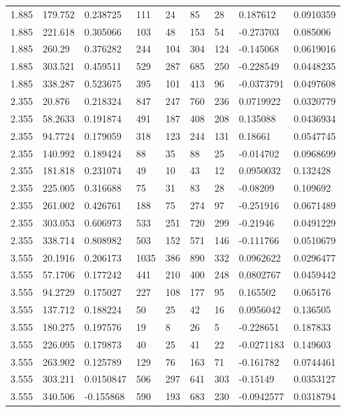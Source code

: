 \documentclass[12pt]{article}
\begin{document}
\begin{table}[!h]
\begin{center}
\begin{tabular}{||l|l|l|l|l|l|l|l|l||}
1.885    &179.752    &0.238725    &111    &24   &85   &28    &0.187612    &0.0910359\\
1.885    &221.618    &0.305066    &103    &48   &153   &54    &-0.273703    &0.085006\\
1.885    &260.29    &0.376282    &244    &104   &304   &124    &-0.145068    &0.0619016\\
1.885    &303.521    &0.459511    &529    &287   &685   &250    &-0.228549    &0.0448235\\
1.885    &338.287    &0.523675    &395    &101   &413   &96    &-0.0373791    &0.0497608\\
\hline
2.355    &20.876    &0.218324    &847    &247   &760   &236    &0.0719922    &0.0320779\\
2.355    &58.2633    &0.191874    &491    &187   &408   &208    &0.135088    &0.0436934\\
2.355    &94.7724    &0.179059    &318    &123   &244   &131    &0.18661    &0.0547745\\
2.355    &140.992    &0.189424    &88    &35   &88   &25    &-0.014702    &0.0968699\\
2.355    &181.818    &0.231074    &49    &10   &43   &12    &0.0950032    &0.132428\\
2.355    &225.005    &0.316688    &75    &31   &83   &28    &-0.08209    &0.109692\\
2.355    &261.002    &0.426761    &188    &75   &274   &97    &-0.251916    &0.0671489\\
2.355    &303.053    &0.606973    &533    &251   &720   &299    &-0.21946    &0.0491229\\
2.355    &338.714    &0.808982    &503    &152   &571   &146    &-0.111766    &0.0510679\\
\hline
3.555    &20.1916    &0.206173    &1035    &386   &890   &332    &0.0962622    &0.0296477\\
3.555    &57.1706    &0.177242    &441    &210   &400   &248    &0.0802767    &0.0459442\\
3.555    &94.2729    &0.175027    &227    &108   &177   &95    &0.165502    &0.065176\\
3.555    &137.712    &0.188224    &50    &25   &42   &16    &0.0956042    &0.136505\\
3.555    &180.275    &0.197576    &19    &8   &26   &5    &-0.228651    &0.187833\\
3.555    &226.095    &0.179873    &40    &25   &41   &22    &-0.0271183    &0.149603\\
3.555    &263.902    &0.125789    &129    &76   &163   &71    &-0.161782    &0.0744461\\
3.555    &303.211    &0.0150847    &506    &297   &641   &303    &-0.15149    &0.0353127\\
3.555    &340.506    &-0.155868    &590    &193   &683   &230    &-0.0942577    &0.0318794\\   
         

\end{tabular}
\end{center}
\end{table}
\end{document}
